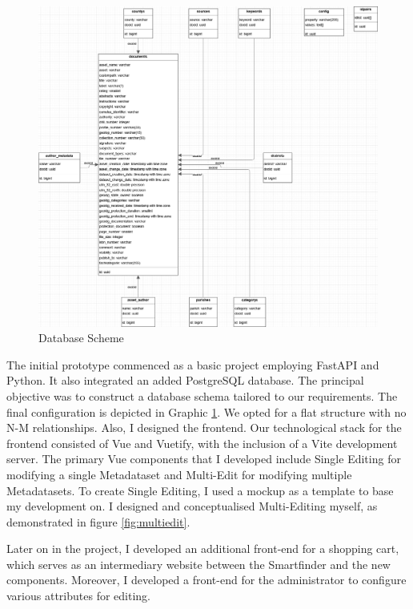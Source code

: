 \documentclass[11pt, titlepage, a4paper]{article}
\begin{document}
\begin{figure}[t]
	\caption{Database Scheme}
	\label{fig:db}
	\includegraphics[width=16cm]{db3.png}
	\centering
\end{figure}

The initial prototype commenced as a basic project employing FastAPI and Python. It also integrated an added PostgreSQL database. The principal objective was to construct a database schema tailored to our requirements. The final configuration is depicted in Graphic \ref{fig:db}. We opted for a flat structure with no N-M relationships. 
Also, I designed the frontend. Our technological stack for the frontend consisted of Vue and Vuetify, with the inclusion of a Vite development server. The primary Vue components that I developed include Single Editing for modifying a single Metadataset and Multi-Edit for modifying multiple Metadatasets. To create Single Editing, I used a mockup as a template to base my development on. I designed and conceptualised Multi-Editing myself, as demonstrated in figure \ref{fig:multiedit}.  

Later on in the project, I developed an additional front-end for a shopping cart, which serves as an intermediary website between the Smartfinder and the new components. Moreover, I developed a front-end for the administrator to configure various attributes for editing.
\end{document}

